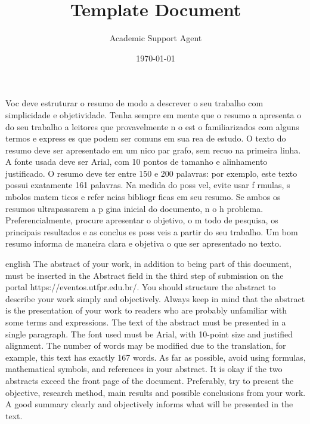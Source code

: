 \documentclass{article}
\title{Template Document}
\author{Academic Support Agent}
\date{\today}
\begin{document}
\maketitle


\begin{paginadetitulo}%

\begin{ambienteresumo}%
Voc  deve estruturar o resumo de modo a descrever o seu trabalho com simplicidade e objetividade. Tenha sempre em mente que o resumo   a apresenta o do seu trabalho a leitores que provavelmente n o est o familiarizados com alguns termos e express es que podem ser comuns em sua  rea de estudo. O texto do resumo deve ser apresentado em um  nico par grafo, sem recuo na primeira linha. A fonte usada deve ser Arial, com 10 pontos de tamanho e alinhamento justificado. O resumo deve ter entre 150 e 200 palavras: por exemplo, este texto possui exatamente 161 palavras. Na medida do poss vel, evite usar f rmulas, s mbolos matem ticos e refer ncias bibliogr ficas em seu resumo. Se ambos os resumos ultrapassarem a p gina inicial do documento, n o h  problema. Preferencialmente, procure apresentar o objetivo, o m todo de pesquisa, os principais resultados e as conclus es poss veis a partir do seu trabalho. Um bom resumo informa de maneira clara e objetiva o que ser  apresentado no texto.
\end{ambienteresumo}

\begin{ambienteresumo}[Abstract]%
\begin{otherlanguage*}{english}%
The abstract of your work, in addition to being part of this document, must be inserted in the Abstract field in the third step of submission on the portal https://eventos.utfpr.edu.br/. You should structure the abstract to describe your work simply and objectively. Always keep in mind that the abstract is the presentation of your work to readers who are probably unfamiliar with some terms and expressions. The text of the abstract must be presented in a single paragraph. The font used must be Arial, with 10-point size and justified alignment. The number of words may be modified due to the translation, for example, this text has exactly 167 words. As far as possible, avoid using formulas, mathematical symbols, and references in your abstract. It is okay if the two abstracts exceed the front page of the document. Preferably, try to present the objective, research method, main results and possible conclusions from your work. A good summary clearly and objectively informs what will be presented in the text.


\end{otherlanguage*}
\end{ambienteresumo}
\end{paginadetitulo}
\end{document}
